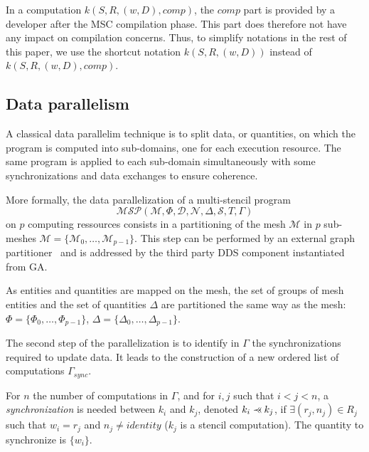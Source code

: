 In a computation $k(S,R,(w,D),comp)$, the $comp$ part is provided by a developer after the MSC compilation phase.
This part does therefore not have any impact on compilation concerns.
Thus, to simplify notations in the rest of this paper, we use the shortcut notation $k(S,R,(w,D))$ instead of $k(S,R,(w,D),comp)$.

\subsection{Data parallelism}
\label{sect:dataparal}
A classical data parallelim technique is to split data, or quantities, on which the program is computed into
sub-domains, one for each execution resource.
The same program is applied to each sub-domain simultaneously with some synchronizations and data exchanges to ensure coherence.

\medskip
More formally, the data parallelization of a multi-stencil program 
\begin{equation*}
\mathcal{MSP}(\mathcal{M},\Phi,\mathcal{D},\mathcal{N},\Delta, \mathcal{S},T,\Gamma)
\end{equation*}
on $p$ computing ressources consists in a partitioning of the mesh $\mathcal{M}$ in $p$ sub-meshes $\mathcal{M}=\{\mathcal{M}_0,\dots,\mathcal{M}_{p-1}\}$.
This step can be performed by an external graph partitioner~\cite{Pellegrini:1996:SSP:645560.658570,DBLP:conf/ieeehpcs/HeleneS13,lachat:hal-00768916} and is addressed by the third party DDS component instantiated from GA. 

As entities and quantities are mapped on the mesh, the set of groups of mesh entities and the set of quantities $\Delta$ are partitioned the same way as the mesh: $\Phi=\{\Phi_0,\dots,\Phi_{p-1}\}$, $\Delta=\{\Delta_0,\dots,\Delta_{p-1}\}$. 

The second step of the parallelization is to identify in $\Gamma$ the synchronizations required to update data.
It leads to the construction of a new ordered list of computations $\Gamma_{sync}$.

\begin{mydef}
For $n$ the number of computations in $\Gamma$, and for $i,j$ such that $i<j<n$, a \textit{synchronization} is needed between $k_i$ and $k_j$, denoted $k_i \pprec k_j$, if $\exists (r_j,n_j) \in R_j$ such that $w_i=r_j$ and $n_j\neq identity$ ($k_j$ is a stencil computation). The quantity to synchronize is $\{w_i\}$.
\label{def:sync}
\end{mydef}

